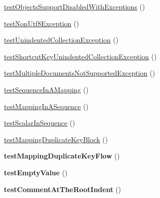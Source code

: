 \begin{DoxyCompactItemize}
\item 
\hyperlink{classSymfony_1_1Component_1_1Yaml_1_1Tests_1_1ParserTest_a4ced79cf2d5bcf034c109b5c02b857b6}{test\+Objects\+Support\+Disabled\+With\+Exceptions} ()
\item 
\hyperlink{classSymfony_1_1Component_1_1Yaml_1_1Tests_1_1ParserTest_a785c6e29ccc65501c2d383386a827dc5}{test\+Non\+Utf8\+Exception} ()
\item 
\hyperlink{classSymfony_1_1Component_1_1Yaml_1_1Tests_1_1ParserTest_a67c3a61756e517cab0863c7749a8daaf}{test\+Unindented\+Collection\+Exception} ()
\item 
\hyperlink{classSymfony_1_1Component_1_1Yaml_1_1Tests_1_1ParserTest_ab97a1a6eacc7c59e0b02227c20ba3647}{test\+Shortcut\+Key\+Unindented\+Collection\+Exception} ()
\item 
\hyperlink{classSymfony_1_1Component_1_1Yaml_1_1Tests_1_1ParserTest_a6d38c2c9f9eebd949a5c12197d2381a0}{test\+Multiple\+Documents\+Not\+Supported\+Exception} ()
\item 
\hyperlink{classSymfony_1_1Component_1_1Yaml_1_1Tests_1_1ParserTest_af5f0997bbd507ecd871038697d68e6f7}{test\+Sequence\+In\+A\+Mapping} ()
\item 
\hyperlink{classSymfony_1_1Component_1_1Yaml_1_1Tests_1_1ParserTest_ae8a08c8f56a931b088d74a1708770f86}{test\+Mapping\+In\+A\+Sequence} ()
\item 
\hyperlink{classSymfony_1_1Component_1_1Yaml_1_1Tests_1_1ParserTest_ad673f9fbaa31bb747614c5e723b05a9c}{test\+Scalar\+In\+Sequence} ()
\item 
\hyperlink{classSymfony_1_1Component_1_1Yaml_1_1Tests_1_1ParserTest_a3f5bb8487bc17fb513ac665e36edcc66}{test\+Mapping\+Duplicate\+Key\+Block} ()
\item 
{\bfseries test\+Mapping\+Duplicate\+Key\+Flow} ()\hypertarget{classSymfony_1_1Component_1_1Yaml_1_1Tests_1_1ParserTest_ab1c6a5dfa8e400bf3d0bccd9e1b42d76}{}\label{classSymfony_1_1Component_1_1Yaml_1_1Tests_1_1ParserTest_ab1c6a5dfa8e400bf3d0bccd9e1b42d76}

\item 
{\bfseries test\+Empty\+Value} ()\hypertarget{classSymfony_1_1Component_1_1Yaml_1_1Tests_1_1ParserTest_a5b355682d18a72e8015fef91d21243f6}{}\label{classSymfony_1_1Component_1_1Yaml_1_1Tests_1_1ParserTest_a5b355682d18a72e8015fef91d21243f6}

\item 
{\bfseries test\+Comment\+At\+The\+Root\+Indent} ()\hypertarget{classSymfony_1_1Component_1_1Yaml_1_1Tests_1_1ParserTest_a11091ebd1ac70b2f050117fcb9e7d15c}{}\label{classSymfony_1_1Component_1_1Yaml_1_1Tests_1_1ParserTest_a11091ebd1ac70b2f050117fcb9e7d15c}


\end{DoxyCompactItemize}
